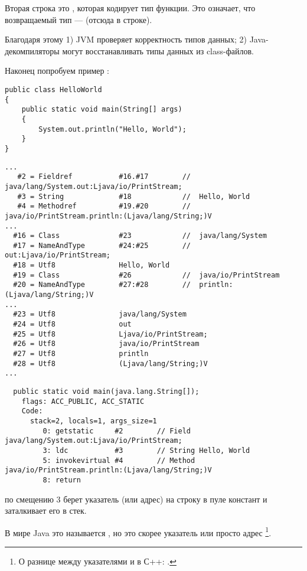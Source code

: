 Вторая строка это , которая кодирует тип функции. Это означает, что возвращаемый тип ---  (отсюда  в строке).

Благодаря этому
1) JVM проверяет корректность типов данных; 
2) Java-декомпиляторы могут восстанавливать типы данных из class-файлов.


Наконец попробуем пример :

\begin{lstlisting}[style=customjava]
public class HelloWorld
{
	public static void main(String[] args)
	{
		System.out.println("Hello, World");
	}
}
\end{lstlisting}

\begin{lstlisting}[caption=Constant pool]
...
   #2 = Fieldref           #16.#17        //  java/lang/System.out:Ljava/io/PrintStream;
   #3 = String             #18            //  Hello, World
   #4 = Methodref          #19.#20        //  java/io/PrintStream.println:(Ljava/lang/String;)V
...
  #16 = Class              #23            //  java/lang/System
  #17 = NameAndType        #24:#25        //  out:Ljava/io/PrintStream;
  #18 = Utf8               Hello, World
  #19 = Class              #26            //  java/io/PrintStream
  #20 = NameAndType        #27:#28        //  println:(Ljava/lang/String;)V
...
  #23 = Utf8               java/lang/System
  #24 = Utf8               out
  #25 = Utf8               Ljava/io/PrintStream;
  #26 = Utf8               java/io/PrintStream
  #27 = Utf8               println
  #28 = Utf8               (Ljava/lang/String;)V
...
\end{lstlisting}

\begin{lstlisting}
  public static void main(java.lang.String[]);
    flags: ACC_PUBLIC, ACC_STATIC
    Code:
      stack=2, locals=1, args_size=1
         0: getstatic     #2        // Field java/lang/System.out:Ljava/io/PrintStream;
         3: ldc           #3        // String Hello, World
         5: invokevirtual #4        // Method java/io/PrintStream.println:(Ljava/lang/String;)V
         8: return        
\end{lstlisting}


 по смещению 3 берет указатель (или адрес) на строку 
в пуле констант и заталкивает его в стек.

В мире Java это называется , но это скорее указатель или просто адрес
\footnote{О разнице между указателями и  в С++: .}.


